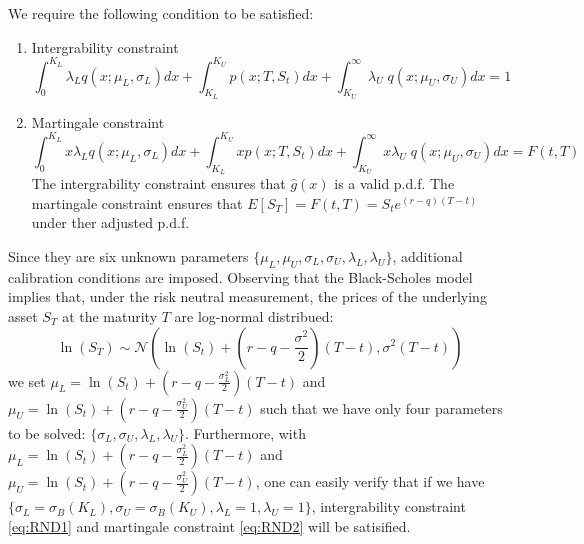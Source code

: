 \documentclass[letterpaper,12pt,titlepage,oneside,final]{book}
\numberwithin{equation}{section}
\theoremstyle{definition}
\begin{document}
We require the following condition to be satisfied:
\begin{enumerate}
\item Intergrability constraint
\begin{equation}
\int_{0}^{K_{L}}	\lambda_{L}   q(x;\mu_{L},\sigma_{L}) dx+
\int_{K_{L}}^{K_{U}}	  p(x;T,S_t)  dx+
\int_{K_{U}}^{\infty}	 \lambda_{U} \;  q(x;\mu_{U},\sigma_{U}) dx=1 
\label{eq:RND1}
\end{equation}
\item Martingale  constraint
\begin{equation}
\int_{0}^{K_{L}}	 x \lambda_{L}   q(x;\mu_{L},\sigma_{L}) dx+
\int_{K_{L}}^{K_{U}}	  x p(x;T,S_t)  dx+
\int_{K_{U}}^{\infty}	 x \lambda_{U} \;  q(x;\mu_{U},\sigma_{U}) dx=F(t,T)
\label{eq:RND2}
\end{equation}
The intergrability constraint ensures that $\hat{g}(x)$ is a valid p.d.f. The martingale  constraint ensures that $E[S_T]=F(t,T)=S_{t}e^{(r-q)(T-t)}$ under ther adjusted p.d.f.


\end{enumerate}
Since they are six  unknown parameters $\{\mu_{L}, \mu_{U},\sigma_{L},\sigma_{U}, \lambda_{L}, \lambda_{U}\}$, additional calibration conditions are imposed. Observing that the Black-Scholes \cite{black1973pricing} model implies that, under the risk neutral measurement, the prices of the underlying asset $S_T$ at the maturity $T$ are log-normal distribued:
 \[
 \ln(S_T) \sim  \mathcal{N}(\ln(S_t)+(r-q-\frac{\sigma^2}{2})(T-t),\sigma^2 (T-t))
 \]
we set $\mu_L=\ln(S_t)+(r-q-\frac{\sigma_L^2}{2})(T-t)$ and $\mu_U=\ln(S_t)+(r-q-\frac{\sigma_U^2}{2})(T-t)$ such that we have only four parameters to be solved: $\{\sigma_{L},\sigma_{U}, \lambda_{L}, \lambda_{U}\}$. Furthermore, with $\mu_L=\ln(S_t)+(r-q-\frac{\sigma_L^2}{2})(T-t)$ and $\mu_U=\ln(S_t)+(r-q-\frac{\sigma_U^2}{2})(T-t)$, one can easily verify that if we have $\{\sigma_{L}=\sigma_{B}(K_L),\sigma_{U}=\sigma_{B}(K_U), \lambda_{L}=1, \lambda_{U}=1\}$, intergrability constraint \eqref{eq:RND1} and martingale  constraint \eqref{eq:RND2} will be  satisified.  
\end{document}
